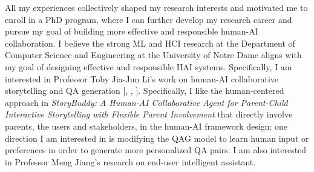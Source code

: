 


All my experiences collectively shaped my research interests and motivated me to enroll in a PhD program, where I can further develop my research career and pursue my goal of building more effective and responsible human-AI collaboration. I believe the strong ML and HCI research at the Department of Computer Science and Engineering at the University of Notre Dame aligns with my goal of designing effective and responsible HAI systems. 
Specifically, I am interested in Professor Toby Jia-Jun Li's work on human-AI collaborative storytelling and QA generation [, , ]. Specifically, I like the human-centered approach in \textit{StoryBuddy: A Human-AI Collaborative Agent for Parent-Child Interactive Storytelling with Flexible Parent Involvement} that directly involve parents, the users and stakeholders, in the human-AI framework design; one direction I am interested in is modifying the QAG model to learn human input or preferences in order to generate more personalized QA pairs.
I am also interested in Professor Meng Jiang's research on end-user intelligent assistant.
